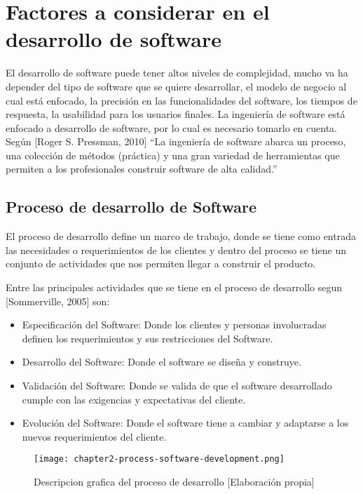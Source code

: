 \chapter{Factores a considerar en el desarrollo de software}
\noindent El desarrollo de software puede tener altos niveles de complejidad, mucho va ha depender del tipo de software que se quiere desarrollar, el modelo de negocio al cual está enfocado, la precisión en las funcionalidades del software, los tiempos de respuesta, la usabilidad para los usuarios finales.
\noindent La ingeniería de software está enfocado a desarrollo de software, por lo cual es necesario tomarlo en cuenta. Según [Roger S. Pressman, 2010] “La ingeniería de software abarca un proceso, una colección de métodos (práctica) y una gran variedad de herramientas que permiten a los profesionales construir software de alta calidad.”


\section{Proceso de desarrollo de Software}
\noindent El proceso de desarrollo define un marco de trabajo, donde se tiene como entrada las necesidades o requerimientos de los clientes y dentro del proceso se tiene un conjunto de actividades que nos permiten llegar a construir el producto.

\noindent Entre las principales actividades que se tiene en el proceso de desarrollo segun [Sommerville, 2005] son:
\begin{itemize}
  \item Especificación del Software: Donde los clientes y personas involucradas definen los requerimientos y sus restricciones del  Software.
  \item Desarrollo del Software: Donde el software se diseña y construye.
  \item Validación del Software: Donde se valida de que el software desarrollado cumple con las exigencias y expectativas del cliente.
  \item Evolución del Software: Donde el software tiene a cambiar y adaptarse a los nuevos requerimientos del cliente.
\end{itemize}

\begin{figure}[ht]
  \centering
  \texttt{[image: chapter2-process-software-development.png]}
  \caption{Descripcion grafica del proceso de desarrollo [Elaboración propia]}  
\end{figure}

